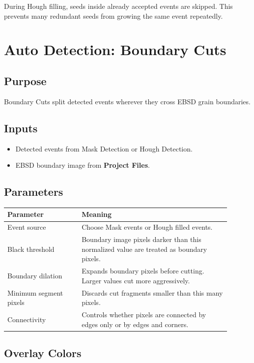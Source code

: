 \documentclass[11pt]{article}
\newcommand{\ui}[1]{\textbf{#1}}
\begin{document}
During Hough filling, seeds inside already accepted events are skipped. This prevents many redundant seeds from growing the same event repeatedly.

\section{Auto Detection: Boundary Cuts}

\subsection{Purpose}

Boundary Cuts split detected events wherever they cross EBSD grain boundaries.

\subsection{Inputs}

\begin{itemize}
    \item Detected events from Mask Detection or Hough Detection.
    \item EBSD boundary image from \ui{Project Files}.
\end{itemize}

\subsection{Parameters}

\begin{longtable}{p{0.3\linewidth}p{0.6\linewidth}}
\toprule
\textbf{Parameter} & \textbf{Meaning} \\
\midrule
Event source & Choose Mask events or Hough filled events. \\
Black threshold & Boundary image pixels darker than this normalized value are treated as boundary pixels. \\
Boundary dilation & Expands boundary pixels before cutting. Larger values cut more aggressively. \\
Minimum segment pixels & Discards cut fragments smaller than this many pixels. \\
Connectivity & Controls whether pixels are connected by edges only or by edges and corners. \\
\bottomrule
\end{longtable}

\subsection{Overlay Colors}
\end{document}
